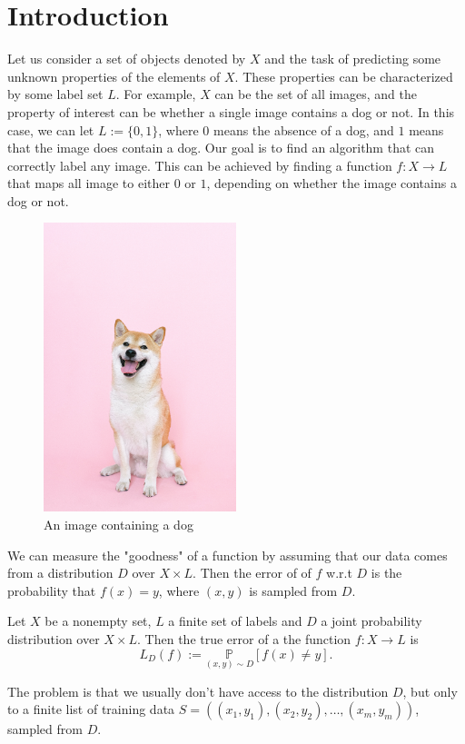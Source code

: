 \chapter{Introduction}
\label{ch:intro}

Let us consider a set of objects denoted by $X$ and the task of predicting some unknown properties of the elements of $X$. These properties can be characterized by some label set $L$. For example, $X$ can be the set of all images, and the property of interest can be whether a single image contains a dog or not. In this case, we can let $L:=\{0, 1\}$, where $0$ means the absence of a dog, and $1$ means that the image does contain a dog. Our goal is to find an algorithm that can correctly label any image. This can be achieved by finding a function $f:X \to L$ that maps all image to either $0$ or $1$, depending on whether the image contains a dog or not.

\begin{figure}[htpb]
    \centering
    \includegraphics[width=0.5\textwidth]{images/doge.jpg}
    \caption{An image containing a dog}
    \label{fig:doge}
\end{figure}

We can measure the "goodness" of a function by assuming that our data comes from a distribution $D$ over $X \times L$. Then the error of of $f$ w.r.t $D$ is the probability that $f(x)=y$, where $(x,y)$ is sampled from $D$.

\begin{definition}
    Let $X$ be a nonempty set, $L$ a finite set of labels and $D$ a joint probability distribution over $X \times L$. Then the true error of a the function $f:X \to L$ is
    \[
        L_{D}(f) :=\underset{(x,y)\sim D}{\mathbb{P}}\left[f(x)\neq y\right]
    .\] 
\end{definition}

The problem is that we usually don't have access to the distribution $D$, but only to a finite list of training data $S=((x_1,y_1), (x_2,y_2), \ldots, (x_m, y_m))$, sampled from $D$.

